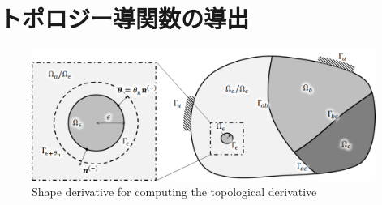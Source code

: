 \chapter{トポロジー導関数の導出}
\begin{figure}[ht]
	\begin{center}
		\includegraphics[width=13cm]{./figures/SDforTD.png}
		\caption{Shape derivative for computing the topological derivative}
		\label{fig:TD}
	\end{center}
\end{figure}

